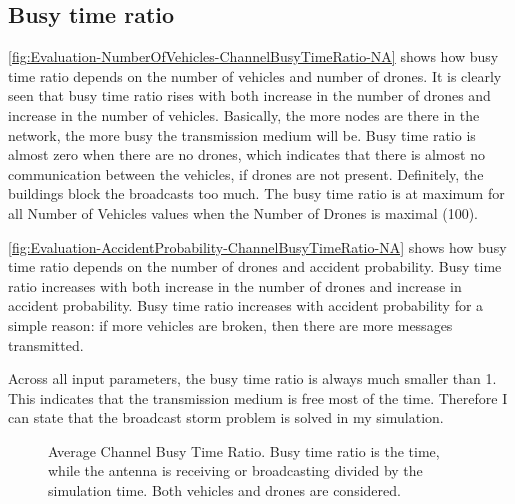 \documentclass[]{nsm-thesis}
\begin{document}
\subsection{Busy time ratio}

\cref{fig:Evaluation-NumberOfVehicles-ChannelBusyTimeRatio-NA} shows how busy time ratio depends on the number of vehicles and number of drones. It is clearly seen that busy time ratio rises with both increase in the number of drones and increase in the number of vehicles. Basically, the more nodes are there in the network, the more busy the transmission medium will be. Busy time ratio is almost zero when there are no drones, which indicates that there is almost no communication between the vehicles, if drones are not present. Definitely, the buildings block the broadcasts too much. The busy time ratio is at maximum for all Number of Vehicles values when the Number of Drones is maximal (100).

\cref{fig:Evaluation-AccidentProbability-ChannelBusyTimeRatio-NA} shows how busy time ratio depends on the number of drones and accident probability.
Busy time ratio increases with both increase in the number of drones and increase in accident probability. Busy time ratio increases with accident probability for a simple reason: if more vehicles are broken, then there are more messages transmitted.

Across all input parameters, the busy time ratio is always much smaller than 1. This indicates that the transmission medium is free most of the time. Therefore I can state that the broadcast storm problem is solved in my simulation.


\begin{figure}%
	\centering
	\hfill
	\hfill
	\caption{Average Channel Busy Time Ratio. Busy time ratio is the time, while the antenna is receiving or broadcasting divided by the simulation time. Both vehicles and drones are considered.}%
	\label{fig:Evaluation-ChannelBusyTimeRatio}%
\end{figure}
\end{document}
